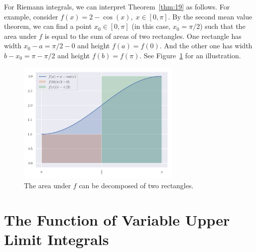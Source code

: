 \documentclass[thmcnt=section, color=blue, 12pt]{my-elegantbook}
\begin{document}
\begin{example}
	For Riemann integrals,
	we can interpret Theorem~\ref{thm:19} as follows.
	For example, consider $f(x) = 2 - \cos(x), \; x \in [0, \pi]$.
	By the second mean value theorem, we can find a point $x_0 \in [0, \pi]$
	(in this case, $x_0 = \pi / 2$) such that
	the area under $f$ is equal to the sum of areas of two rectangles.
	One rectangle has width $x_0 - a = \pi/2 - 0$ and height $f(a) = f(0)$.
	And the other one has width $b - x_0=\pi -  \pi/2$ and height $f(b) = f(\pi)$.
	See Figure~\ref{fig:8} for an illustration.

	\begin{figure}[H]
		\centering
		\includegraphics[width=0.7\textwidth]{figures/mean-value-theorem-for-riemann-stieltjes-integrals-second-mean-value-theorem.png}
		\caption{The area under $f$ can be decomposed of two rectangles.}
		\label{fig:8}
	\end{figure}
\end{example}



\section{The Function of Variable Upper Limit Integrals}
\end{document}
